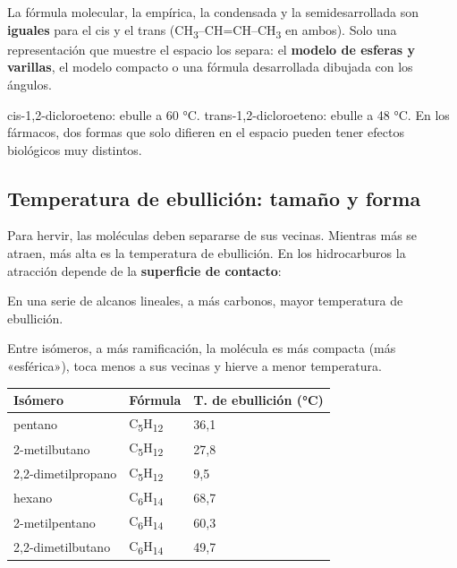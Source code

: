 \begin{clave} La fórmula molecular, la empírica, la condensada y la semidesarrollada son \textbf{iguales} para el cis y el trans (CH\textsubscript{3}--CH=CH--CH\textsubscript{3} en ambos). Solo una representación que muestre el espacio los separa: el \textbf{modelo de esferas y varillas}, el modelo compacto o una fórmula desarrollada dibujada con los ángulos.\end{clave}
 
\begin{clave} cis-1,2-dicloroeteno: ebulle a 60 °C. trans-1,2-dicloroeteno: ebulle a 48 °C. En los fármacos, dos formas que solo difieren en el espacio pueden tener efectos biológicos muy distintos.\end{clave}
\subsection{Temperatura de ebullición: tamaño y forma}
Para hervir, las moléculas deben separarse de sus vecinas. Mientras más se atraen, más alta es la temperatura de ebullición. En los hidrocarburos la atracción depende de la \textbf{superficie de contacto}:

 
\begin{clave} En una serie de alcanos lineales, a más carbonos, mayor temperatura de ebullición.\end{clave}
 
\begin{clave} Entre isómeros, a más ramificación, la molécula es más compacta (más «esférica»), toca menos a sus vecinas y hierve a menor temperatura.\end{clave}
  
\begin{center}\small
\begin{tabular}{@{}lll@{}}
\toprule
\textbf{Isómero} & \textbf{Fórmula} & \textbf{T. de ebullición (°C)} \\
\midrule
pentano & C\textsubscript{5}H\textsubscript{12} & 36,1 \\
2-metilbutano & C\textsubscript{5}H\textsubscript{12} & 27,8 \\
2,2-dimetilpropano & C\textsubscript{5}H\textsubscript{12} & 9,5 \\
hexano & C\textsubscript{6}H\textsubscript{14} & 68,7 \\
2-metilpentano & C\textsubscript{6}H\textsubscript{14} & 60,3 \\
2,2-dimetilbutano & C\textsubscript{6}H\textsubscript{14} & 49,7 \\
\bottomrule
\end{tabular}
\end{center}
 
